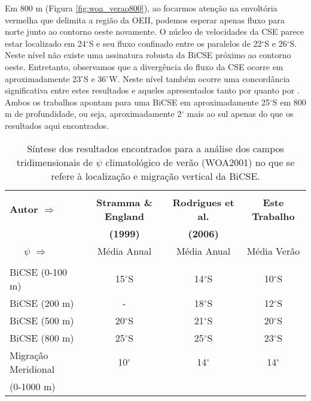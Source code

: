 Em 800 m (Figura \ref{fig:woa_verao800}), ao focarmos atenção na envoltória vermelha
que delimita a região da OEII, podemos esperar apenas fluxo para norte junto ao contorno oeste novamente. 
O núcleo de velocidades
da CSE parece estar localizado em 24$^\circ$S e seu fluxo confinado entre os paralelos de 22$^\circ$S e 
26$^\circ$S. Neste nível não existe uma assinatura robusta da BiCSE próximo ao contorno oeste. Entretanto, 
 observamos que  a divergência do fluxo da CSE ocorre em aproximadamente 23$^\circ$S e 36$^\circ$W.  
Neste nível também ocorre uma concordância significativa entre
estes resultados e aqueles apresentados tanto por \cite{stramma_england1999} quanto por 
\cite{rodrigues_etal2006}. Ambos os trabalhos apontam para
uma BiCSE em aproximadamente 25$^\circ$S em 800 m de profundidade, ou seja, aproximadamente 2$^\circ$ mais ao sul apenas
do que os resultados aqui encontrados. 

\begin{table}
\caption{\label{tab:woa} \small Síntese dos resultados encontrados para a análise dos campos tridimensionais de 
$\psi$ climatológico de verão (WOA2001) no que se refere à localização e migração vertical da BiCSE.}
\begin{center}
\begin{tabular}{lccc}
\hline 
 & & & \vspace{-0.4cm}\\
 {\bf Autor $\Rightarrow$} & {\bf Stramma \& England} & {\bf Rodrigues et al.} & {\bf Este Trabalho} \\ 
& {\bf (1999)} & {\bf (2006)} & \\
 {\large \ \ \  $\psi$ $\Rightarrow$} & Média Anual  & Média Anual & Média Verão \vspace{0.1cm}\\
\hline 
 & & & \vspace{-0.4cm}\\
BiCSE (0-100 m) & 15$^\circ$S & 14$^\circ$S & 10$^\circ$S \vspace{0.1cm} \\ 
BiCSE (200 m) & - & 18$^\circ$S & 12$^\circ$S \vspace{0.1cm} \\ 
BiCSE (500 m) & 20$^\circ$S & 21$^\circ$S & 20$^\circ$S \vspace{0.1cm} \\ 
BiCSE (800 m) & 25$^\circ$S & 25$^\circ$S & 23$^\circ$S \vspace{0.1cm} \\
Migração Meridional & 10$^\circ$ & 14$^\circ$ & 14$^\circ$ \vspace{-0.2cm}\\
\hspace{10mm} {\footnotesize (0-1000 m)} & & & \\
\hline
\end{tabular}
\end{center}
\end{table}

